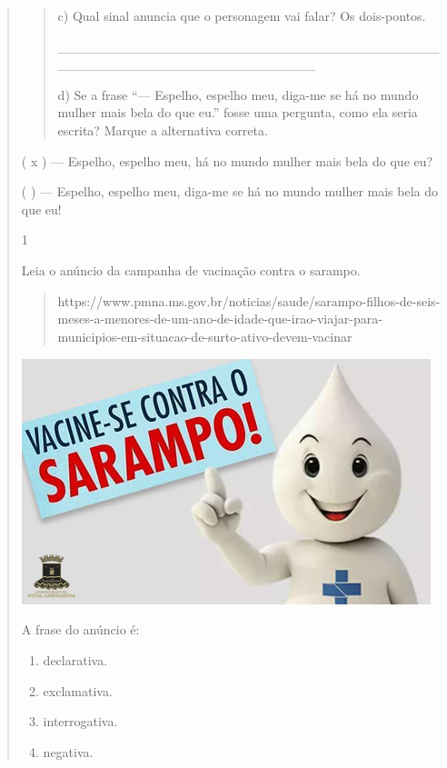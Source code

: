 \begin{boxlist}
\begin{quote}
\begin{iteize}
{\begin{quote}
c) Qual sinal anuncia que o personagem vai falar? Os dois-pontos.

\_\_\_\_\_\_\_\_\_\_\_\_\_\_\_\_\_\_\_\_\_\_\_\_\_\_\_\_\_\_\_\_\_\_\_\_\_\_\_\_\_\_\_\_\_\_\_\_\_\_\_\_\_\_\_\_\_\_\_\_\_\_\_\_\_\_\_

d) Se a frase ``--- Espelho, espelho meu, diga-me se há no mundo mulher
mais bela do que eu.'' fosse uma pergunta, como ela seria escrita?
Marque a alternativa correta.
\end{quote}

( x ) --- Espelho, espelho meu, há no mundo mulher mais bela do que eu?

( ) --- Espelho, espelho meu, diga-me se há no mundo mulher mais bela do
que eu!


\num{1}

Leia o anúncio da campanha de vacinação contra o sarampo.

\begin{quote}
https://www.pmna.ms.gov.br/noticias/saude/sarampo-filhos-de-seis-meses-a-menores-de-um-ano-de-idade-que-irao-viajar-para-municipios-em-situacao-de-surto-ativo-devem-vacinar
\end{quote}

\includegraphics[width=4.68681in,height=2.81736in]{media/image7.jpeg}

A frase do anúncio é:

\begin{enumerate}
\def\labelenumi{(\Alph{enumi})}
\item
  declarativa.
\item
  exclamativa.
\item
  interrogativa.
\item
  negativa.
\end{enumerate}

}
\end{iteize}
\end{quote}
\end{boxlist}
